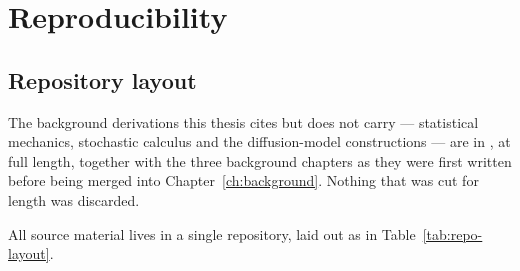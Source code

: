 \chapter{Reproducibility}\label{app:repro}

\setlength{\emergencystretch}{2em}

\section{Repository layout}

\noindent The background derivations this thesis cites but does not carry ---
statistical mechanics, stochastic calculus and the diffusion-model
constructions --- are in \compendium{}, at full length, together with the
three background chapters as they were first written before being merged into
Chapter~\ref{ch:background}. Nothing that was cut for length was discarded.

All source material lives in a single repository, laid out as in
Table~\ref{tab:repo-layout}.

